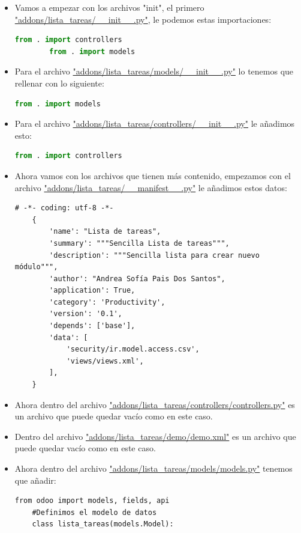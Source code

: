 \documentclass[a4paper,12pt]{article}
\begin{document}
\begin{itemize}
    \item Vamos a empezar con los archivos "init", el primero \url{"addons/lista_tareas/__init__.py"}, le podemos estas importaciones:
    \begin{lstlisting}[language=Python]
        from . import controllers
        from . import models
    \end{lstlisting}
    \item Para el archivo \url{"addons/lista_tareas/models/__init__.py"} lo tenemos que rellenar con lo siguiente:
    \begin{lstlisting}[language=Python]
        from . import models
    \end{lstlisting}
    \item Para el archivo \url{"addons/lista_tareas/controllers/__init__.py"} le añadimos esto:
    \begin{lstlisting}[language=Python]
        from . import controllers
    \end{lstlisting}
    \item Ahora vamos con los archivos que tienen más contenido, empezamos con el archivo \url{"addons/lista_tareas/__manifest__.py"} le añadimos estos datos:
    \begin{Verbatim}[frame=single, fontsize=\small]
    # -*- coding: utf-8 -*-
    {
        'name': "Lista de tareas",
        'summary': """Sencilla Lista de tareas""",
        'description': """Sencilla lista para crear nuevo módulo""",
        'author': "Andrea Sofía Pais Dos Santos",
        'application': True,
        'category': 'Productivity',
        'version': '0.1',
        'depends': ['base'],
        'data': [
            'security/ir.model.access.csv',
            'views/views.xml',
        ],
    }
    \end{Verbatim}
        \item Ahora dentro del archivo \url{"addons/lista_tareas/controllers/controllers.py"} es un archivo que puede quedar vacío como en este caso.
        \item Dentro del archivo \url{"addons/lista_tareas/demo/demo.xml"} es un archivo que puede quedar vacío como en este caso.
        \item Ahora dentro del archivo \url{"addons/lista_tareas/models/models.py"} tenemos que añadir:
        \begin{Verbatim}[frame=single, fontsize=\small]
    from odoo import models, fields, api
    #Definimos el modelo de datos
    class lista_tareas(models.Model):

\end{Verbatim}
\end{itemize}
\end{document}
